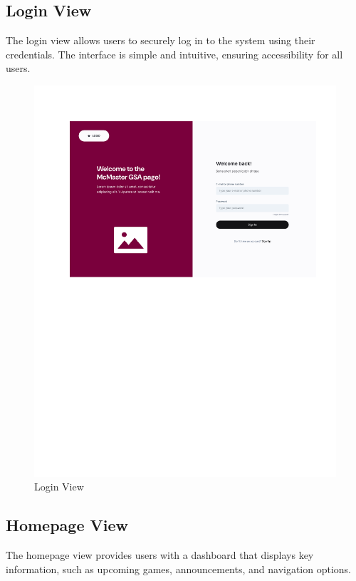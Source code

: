 \documentclass[12pt, titlepage]{article}
\begin{document}
\newpage

\subsection{Login View}
The login view allows users to securely log in to the system using their credentials. The interface is simple and intuitive, ensuring accessibility for all users.

\begin{figure}[H]
  \centering
  \includegraphics[scale=0.7]{loginpage.pdf}
  \caption{Login View}
  \label{fig:login_view}
\end{figure}

\newpage

\subsection{Homepage View}
The homepage view provides users with a dashboard that displays key information, such as upcoming games, announcements, and navigation options.
\end{document}
